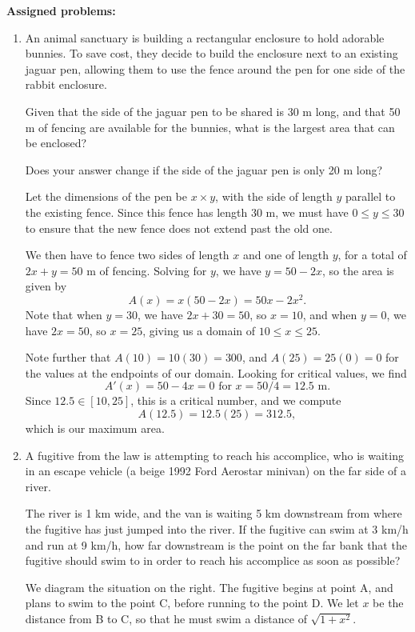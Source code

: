 \documentclass[12pt]{article}
\begin{document}
\textbf{Assigned problems:}
\begin{enumerate}
\item An animal sanctuary is building a rectangular enclosure to hold adorable bunnies. To save cost, they decide to build the enclosure next to an existing jaguar pen, allowing them to use the fence around the pen for one side of the rabbit enclosure.

Given that the side of the jaguar pen to be shared is 30 m long, and that 50 m of fencing are available for the bunnies, what is the largest area that can be enclosed?

Does your answer change if the side of the jaguar pen is only 20 m long?

\bigskip

Let the dimensions of the pen be $x\times y$, with the side of length $y$ parallel to the existing fence. Since this fence has length 30 m, we must have $0\leq y\leq 30$ to ensure that the new fence does not extend past the old one.

We then have to fence two sides of length $x$ and one of length $y$, for a total of $2x+y=50$ m of fencing. Solving for $y$, we have $y=50-2x$, so the area is given by
\[
A(x)=x(50-2x)=50x-2x^2.
\]
Note that when $y=30$, we have $2x+30=50$, so $x=10$, and when $y=0$, we have $2x=50$, so $x=25$, giving us a domain of $10\leq x\leq 25$.

Note further that $A(10) = 10(30)=300$, and $A(25) = 25(0)=0$ for the values at the endpoints of our domain. Looking for critical values, we find
\[
A'(x)= 50-4x=0 \text{ for } x = 50/4 = 12.5 \text{ m}.
\]
Since $12.5\in [10,25]$, this is a critical number, and we compute
\[
A(12.5) = 12.5(25) = 312.5,
\]
which is our maximum area.
\newpage

\item A fugitive from the law is attempting to reach his accomplice, who is waiting in an escape vehicle (a beige 1992 Ford Aerostar minivan) on the far side of a river.

The river is 1 km wide, and the van is waiting 5 km downstream from where the fugitive has just jumped into the river. If the fugitive can swim at 3 km/h and run at 9 km/h, how far downstream is the point on the far bank that the fugitive should swim to in order to reach his accomplice as soon as possible?

\bigskip

\begin{multicols}{2}
We diagram the situation on the right. The fugitive begins at point A, and plans to swim to the point C, before running to the point D. We let $x$ be the distance from B to C, so that he must swim a distance of $\sqrt{1+x^2}$.
\columnbreak



\end{multicols}
\end{enumerate}
\end{document}

